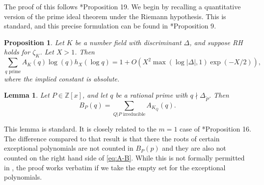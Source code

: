 \documentclass[12pt, notitlepage]{amsart}
\numberwithin{equation}{section}
\def\Z{\mathbb Z}
\def\wt{\widetilde}
\newtheorem{lemma}[theorem]{Lemma}
\newtheorem{proposition}[theorem]{Proposition}
\theoremstyle{remark}
\theoremstyle{definition}
\theoremstyle{remark}
\numberwithin{equation}{section}
\begin{document}
The proof of this follows \cite{BV19}*{Proposition 19}.
We begin by recalling a quantitative version of the prime ideal theorem under
the Riemann hypothesis.
This is standard, and this precise formulation can be found in
\cite{BV19}*{Proposition 9}.


\begin{proposition}\label{pr:prime-number-theorem}
Let $K$ be a number field with discriminant $\Delta$, and suppose
RH holds for $\zeta_K$.
Let $X>1$.
Then
\[
\sum_{\text{$q$ prime}} A_K(q)\log(q) h_X(\log q)
=1+O(X^2\max(\log|\Delta|,1)\exp(-X/2)),
\]
where the implied constant is absolute.
\end{proposition}




\begin{lemma}\label{lm:A-B}
Let $P\in\Z[x]$, and let $q$ be a rational prime with $q\nmid\Delta_{\wt P}$.
Then
\begin{equation}\label{eq:A-B}
B_P(q)=\sum_{\text{$Q|P$ irreducible}} A_{K_Q}(q).
\end{equation}
\end{lemma}

This lemma is standard.
It is closely related to the $m=1$ case of \cite{BV19}*{Proposition 16}.
The difference compared to that result is that there the roots of certain
exceptional polynomials are not counted in $B_P(p)$ and they are also not
counted on the right hand side of \eqref{eq:A-B}.
While this is not formally permitted in \cite{BV19}, the proof works verbatim
if we take the empty set for the exceptional polynomials.
\end{document}
